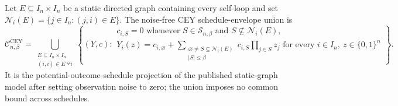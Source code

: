 Let \(E\subseteq I_n\times I_n\) be a static directed graph containing every self-loop and set \(\mathcal N_i(E)=\{j\in I_n:(j,i)\in E\}\).  The noise-free CEY schedule-envelope union is
\[
\mathcal C^{\mathrm{CEY}}_{n,\beta}
=\bigcup_{\substack{E\subseteq I_n\times I_n\\(i,i)\in E\ \forall i}}
\left\{(Y,c):
\begin{array}{l}
c_{i,S}=0\text{ whenever }S\in\mathcal S_{n,\beta}\text{ and }S\nsubseteq\mathcal N_i(E),\\
Y_i(z)=c_{i,\varnothing}+\displaystyle\sum_{\substack{\varnothing\ne S\subseteq\mathcal N_i(E)\\|S|\le\beta}}c_{i,S}\prod_{j\in S}z_j
\text{ for every }i\in I_n,\ z\in\{0,1\}^n
\end{array}\right\}.
\]
It is the potential-outcome-schedule projection of the published static-graph model after setting observation noise to zero; the union imposes no common bound across schedules.
